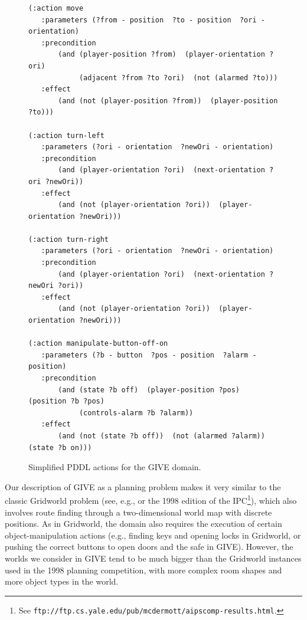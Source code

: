 \begin{figure}
\centering
\begin{minipage}{0.9\textwidth}
{\small%
\begin{verbatim}
(:action move
   :parameters (?from - position  ?to - position  ?ori - orientation)
   :precondition 
       (and (player-position ?from)  (player-orientation ?ori)
            (adjacent ?from ?to ?ori)  (not (alarmed ?to)))
   :effect 
       (and (not (player-position ?from))  (player-position ?to)))

(:action turn-left
   :parameters (?ori - orientation  ?newOri - orientation)
   :precondition 
       (and (player-orientation ?ori)  (next-orientation ?ori ?newOri))
   :effect 
       (and (not (player-orientation ?ori))  (player-orientation ?newOri)))

(:action turn-right
   :parameters (?ori - orientation  ?newOri - orientation)
   :precondition 
       (and (player-orientation ?ori)  (next-orientation ?newOri ?ori))
   :effect 
       (and (not (player-orientation ?ori))  (player-orientation ?newOri)))

(:action manipulate-button-off-on
   :parameters (?b - button  ?pos - position  ?alarm - position)
   :precondition 
       (and (state ?b off)  (player-position ?pos)  (position ?b ?pos)
            (controls-alarm ?b ?alarm))
   :effect
       (and (not (state ?b off))  (not (alarmed ?alarm))  (state ?b on)))
\end{verbatim}}%
\end{minipage}
\caption{Simplified PDDL actions for the GIVE domain.}
\label{fig:give-planning}
\end{figure}

Our description of GIVE as a planning problem makes it very similar to the
classic Gridworld problem (see, e.g., \citealt{Tovey-Koenig:2000}
or the 1998 edition of the IPC\footnote{See
\texttt{ftp://ftp.cs.yale.edu/pub/mcdermott/aipscomp-results.html}.}),
which also involves route finding through a two-dimensional world map with
discrete positions. As in Gridworld, the domain also requires the
execution of certain object-manipulation actions (e.g., finding keys and
opening locks in Gridworld, or pushing the correct buttons to open doors
and the safe in GIVE). However, the worlds we consider in GIVE tend to be
much bigger than the Gridworld instances used in the 1998 planning
competition, with more complex room shapes and more object types in the
world.

